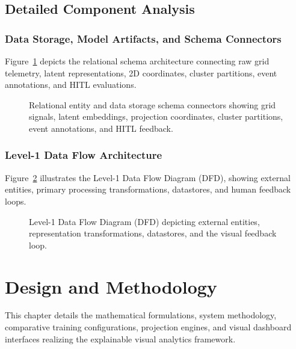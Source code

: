 \documentclass[12pt,a4paper]{report}
\begin{document}
\section{Detailed Component Analysis}

\subsection{Data Storage, Model Artifacts, and Schema Connectors}
Figure~\ref{fig:db_schema} depicts the relational schema architecture connecting raw grid telemetry, latent representations, 2D coordinates, cluster partitions, event annotations, and HITL evaluations.

\begin{figure}[H]
    \centering
    \caption{Relational entity and data storage schema connectors showing grid signals, latent embeddings, projection coordinates, cluster partitions, event annotations, and HITL feedback.}
    \label{fig:db_schema}
\end{figure}

\subsection{Level-1 Data Flow Architecture}
Figure~\ref{fig:data_flow_diagram} illustrates the Level-1 Data Flow Diagram (DFD), showing external entities, primary processing transformations, datastores, and human feedback loops.

\begin{figure}[H]
    \centering
    \caption{Level-1 Data Flow Diagram (DFD) depicting external entities, representation transformations, datastores, and the visual feedback loop.}
    \label{fig:data_flow_diagram}
\end{figure}


\chapter{Design and Methodology}

This chapter details the mathematical formulations, system methodology, comparative training configurations, projection engines, and visual dashboard interfaces realizing the explainable visual analytics framework.
\end{document}
